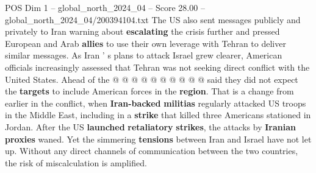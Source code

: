 \begin{textsample}{POS Dim 1 – global\_north\_2024\_04 – Score 28.00 – global\_north\_2024\_04/200394104.txt}
The US also sent messages publicly and privately to Iran warning about \textbf{escalating} the crisis further and pressed European and Arab \textbf{allies} to use their own leverage with Tehran to deliver similar messages.
As Iran ' s plans to attack Israel grew clearer, American officials increasingly assessed that Tehran was not seeking direct conflict with the United States.
Ahead of the @ @ @ @ @ @ @ @ @ @ said they did not expect the \textbf{targets} to include American forces in the \textbf{region}.
That is a change from earlier in the conflict, when \textbf{Iran-backed} \textbf{militias} regularly attacked US troops in the Middle East, including in a \textbf{strike} that killed three Americans stationed in Jordan.
After the US \textbf{launched} \textbf{retaliatory} \textbf{strikes}, the attacks by \textbf{Iranian} \textbf{proxies} waned.
Yet the simmering \textbf{tensions} between Iran and Israel have not let up.
Without any direct channels of communication between the two countries, the risk of miscalculation is amplified.

\end{textsample}

